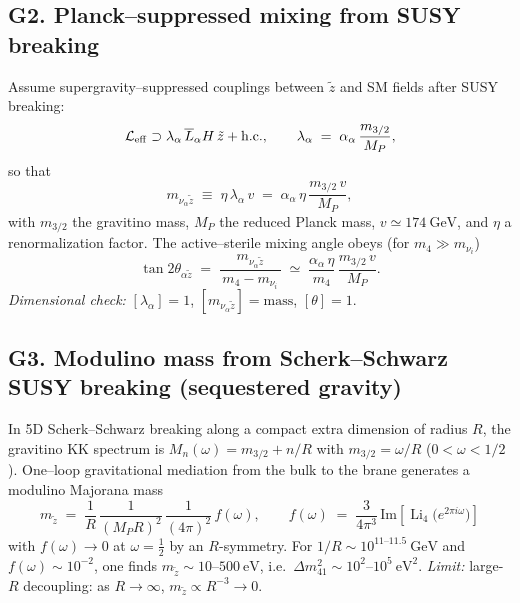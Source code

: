 \documentclass[11pt]{article}
\begin{document}
      \subsection*{G2. Planck--suppressed mixing from SUSY breaking}
          Assume supergravity--suppressed couplings between $\tilde z$ and SM fields after SUSY breaking:
          \begin{equation}
          \mathcal L_{\rm eff}\supset
          \lambda_\alpha\,\overline{L}_\alpha H\,\tilde z+\text{h.c.},
          \qquad
          \lambda_\alpha \;=\; \alpha_\alpha\,\frac{m_{3/2}}{M_P},
          \end{equation}
          so that
          \begin{equation}
          m_{\nu_\alpha \tilde z}\;\equiv\;\eta\,\lambda_\alpha\,v
          \;=\; \alpha_\alpha\,\eta\,\frac{m_{3/2}\,v}{M_P},
          \end{equation}
          with $m_{3/2}$ the gravitino mass, $M_P$ the reduced Planck mass, $v\simeq 174~\mathrm{GeV}$, and $\eta$ a renormalization factor. The active--sterile mixing angle obeys (for $m_4\gg m_{\nu_i}$)
          \begin{equation}
          \tan 2\theta_{\alpha\tilde z}
          \;=\; \frac{m_{\nu_\alpha\tilde z}}{\,m_4-m_{\nu_i}\,}
          \;\simeq\; \frac{\alpha_\alpha\,\eta}{m_4}\,
          \frac{m_{3/2}\,v}{M_P}.
          \end{equation}
          \textit{Dimensional check:} $[\lambda_\alpha]=1$, $[m_{\nu_\alpha\tilde z}]=\mathrm{mass}$, $[\theta]=1$.

      \subsection*{G3. Modulino mass from Scherk--Schwarz SUSY breaking (sequestered gravity)}
          In 5D Scherk--Schwarz breaking along a compact extra dimension of radius $R$, the gravitino KK spectrum is
          $M_n(\omega)=m_{3/2}+n/R$ with $m_{3/2}=\omega/R$ ($0<\omega<1/2$). One--loop gravitational mediation from the bulk to the brane generates a modulino Majorana mass
          \begin{equation}
          \boxed{\;
          m_{\tilde z}
              \;=\;
              \frac{1}{R}\,\frac{1}{(M_P R)^2}\,\frac{1}{(4\pi)^2}\,f(\omega),
              \qquad
              f(\omega)\;=\;\frac{3}{4\pi^3}\,\mathrm{Im}\!\left[\operatorname{Li}_4\!\big(e^{2\pi i\omega}\big)\right]\; }
          \end{equation}
          with $f(\omega)\to 0$ at $\omega=\tfrac12$ by an $R$-symmetry. For $1/R\sim 10^{11\text{--}11.5}~\mathrm{GeV}$ and
          $f(\omega)\sim 10^{-2}$, one finds $m_{\tilde z}\sim 10$--$500~\mathrm{eV}$,
          i.e.\ $\Delta m^2_{41}\sim 10^{2}$--$10^{5}~\mathrm{eV}^2$.
          \textit{Limit:} large-$R$ decoupling: as $R\!\to\!\infty$, $m_{\tilde z}\propto R^{-3}\to 0$.
\end{document}
